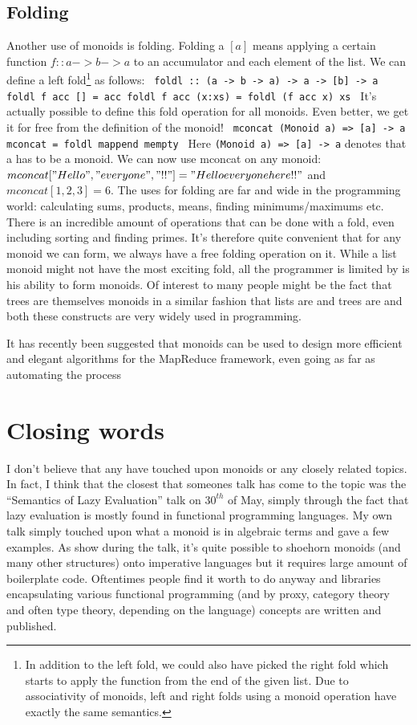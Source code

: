 \documentclass{acm_proc_article-sp}
\begin{document}
\subsection{Folding}
Another use of monoids is folding. Folding a $[a]$ means applying a
certain function $f :: a -> b -> a$ to an accumulator and each element
of the list. We can define a left fold\footnote{In addition to the
  left fold, we could also have picked the right fold which starts to
  apply the function from the end of the given list. Due to
  associativity of monoids, left and right folds using a monoid
  operation have exactly the same semantics.} as follows:
\texttt{
foldl :: (a -> b -> a) -> a -> [b] -> a
foldl f acc [] = acc
foldl f acc (x:xs) = foldl (f acc x) xs
}
It's actually possible to define this fold operation for all
monoids. Even better, we get it for free from the definition of the
monoid!
\texttt{
mconcat (Monoid a) => [a] -> a
mconcat = foldl mappend mempty
}
Here \texttt{(Monoid a) => [a] -> a} denotes that a has to be a
monoid. We can now use mconcat on any monoid: $mconcat ["Hello ",
"everyone ", "!!"] = "Hello everyone here!!"$ and $mconcat [1, 2, 3] =
6$. The uses for folding are far and wide in the programming world:
calculating sums, products, means, finding minimums/maximums etc. There is an
incredible amount of operations that can be done with a fold, even
including sorting and finding primes\cite{haskell:fold}. It's
therefore quite convenient that for any monoid we can form, we always
have a free folding operation on it. While a list monoid might not
have the most exciting fold, all the programmer is limited by is his
ability to form monoids. Of interest to many people might be the fact
that trees are themselves monoids in a similar fashion that lists are
and trees are and both these constructs are very widely used in programming.

It has recently been suggested that monoids can be used to design more
efficient and elegant algorithms for the MapReduce framework, even
going as far as automating the process\cite{Lin:monodify}

\section{Closing words}
I don't believe that any have touched upon monoids or any closely
related topics. In fact, I think that the closest that someones talk
has come to the topic was the ``Semantics of Lazy Evaluation'' talk on
$30^{th}$ of May, simply through the fact that lazy evaluation is
mostly found in functional programming languages. My own talk simply
touched upon what a monoid is in algebraic terms and gave a few
examples. As show during the talk, it's quite possible to shoehorn
monoids (and many other structures) onto imperative languages but it
requires large amount of boilerplate code. Oftentimes people find it
worth to do anyway and libraries encapsulating various functional
programming (and by proxy, category theory and often type theory,
depending on the language) concepts are written and
published\cite{java:functional}.
\end{document}
